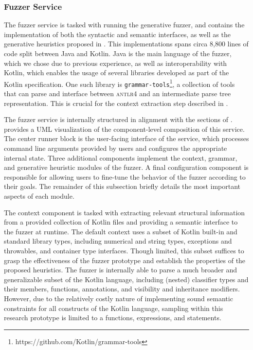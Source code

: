 \subsubsection{Fuzzer Service}

The fuzzer service is tasked with running the generative fuzzer,
and contains the implementation of both the syntactic and semantic interfaces,
as well as the generative heuristics proposed in .
This implementations spans circa 8,800 lines of code split between
Java and Kotlin.
Java is the main language of the fuzzer, which we chose due to previous experience, as well
as interoperability with Kotlin, which enables the usage of several libraries
developed as part of the Kotlin specification.
One such library is \texttt{grammar-tools}\footnote{https://github.com/Kotlin/grammar-tools},
a collection of tools that can parse and interface between \textsc{antlr4} and
an intermediate parse tree representation.
This is crucial for the context extraction step described in .

The fuzzer service is internally structured in alignment with
the sections of .
 provides a UML visualization
of the component-level composition of this service.
The center runner block is the user-facing interface
of the service, which processes command line arguments
provided by users and configures the appropriate internal state.
Three additional components implement the context, grammar,
and generative heuristic modules of the fuzzer.
A final configuration component is responsible for allowing
users to fine-tune the behavior of the fuzzer according to their goals.
The remainder of this subsection briefly details the most important
aspects of each module.

The context component is tasked with extracting relevant structural
information from a provided collection of Kotlin
files and providing a semantic interface to the fuzzer
at runtime.
The default context uses a subset of Kotlin built-in and standard library types,
including numerical and string types, exceptions and throwables, and container type interfaces.
Though limited, this subset suffices to grasp the effectiveness of the fuzzer prototype
and establish the properties of the proposed heuristics.
The fuzzer is internally able to parse a much broader and generalizable subset
of the Kotlin language, including (nested) classifier types
and their members, functions, annotations,
and visibility and inheritance modifiers.
However, due to the relatively costly nature of implementing sound
semantic constraints for all constructs of the Kotlin language,
sampling within this research prototype
is limited to a functions, expressions, and statements.

